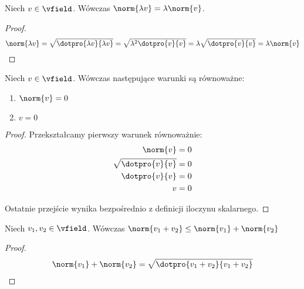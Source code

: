 \begin{fact}
Niech \(v \in \vfield\). Wówczas \( \norm{\lambda v} = \lambda \norm{v}\).

\end{fact}
\begin{proof}
\[
\norm{\lambda v} = \sqrt{\dotpro{\lambda v}{\lambda v}} = \sqrt{\lambda^2 \dotpro{v}{v}} = \lambda \sqrt{\dotpro{v}{v}} = \lambda \norm{v}
\]
\end{proof}
\begin{fact}
Niech \(v \in \vfield\). Wówczas następujące warunki są równoważne:

\begin{enumerate}
    \item \(\norm{v} = 0\)
    \item \(v = 0\)
\end{enumerate}

\end{fact}
\begin{proof}
Przekształcamy pierwszy warunek równoważnie: 
\begin{align*}
    \norm{v} = 0 \\
    \sqrt{\dotpro{v}{v}} = 0 \\ 
    \dotpro{v}{v} = 0 \\
    v = 0
\end{align*}

Ostatnie przejście wynika bezpośrednio z definicji iloczynu skalarnego.
\end{proof}
\begin{fact}

\end{fact}

\begin{fact}
Niech \(v_1, v_2 \in \vfield\). Wówczas \(\norm{v_1 + v_2} \leq \norm{v_1} + \norm{v_2}\)

\end{fact}
\begin{proof}
\begin{align*}
    \norm{v_1} + \norm{v_2} &= \sqrt{\dotpro{v_1 + v_2}{v_1 + v_2}}  \\
\end{align*}
\end{proof}